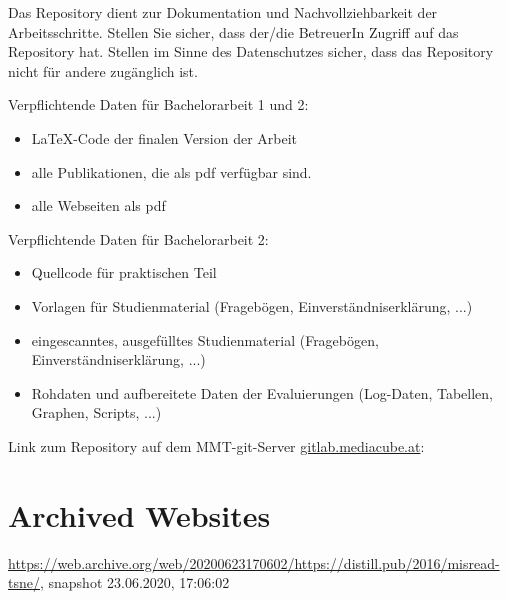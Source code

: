 \begin{appendices}
Das Repository dient zur Dokumentation und Nachvollziehbarkeit der Arbeitsschritte. Stellen Sie sicher, dass der/die BetreuerIn Zugriff auf das Repository hat. Stellen im Sinne des Datenschutzes sicher, dass das Repository nicht für andere zugänglich ist.

Verpflichtende Daten für Bachelorarbeit 1 und 2:

\begin{itemize}
	\item LaTeX-Code der finalen Version der Arbeit
	\item alle Publikationen, die als pdf verfügbar sind.
	\item alle Webseiten als pdf
\end{itemize}

Verpflichtende Daten für Bachelorarbeit 2:
\begin{itemize}
	\item Quellcode für praktischen Teil
	\item Vorlagen für Studienmaterial (Fragebögen, Einverständniserklärung, ...)	
	\item eingescanntes, ausgefülltes Studienmaterial (Fragebögen, Einverständniserklärung, ...)
	\item Rohdaten und aufbereitete Daten der Evaluierungen (Log-Daten, Tabellen, Graphen, Scripts, ...)	
\end{itemize}

Link zum Repository auf dem MMT-git-Server {\url{gitlab.mediacube.at}}:

	


\section{Archived Websites}
\sloppy
\url{https://web.archive.org/web/20200623170602/https://distill.pub/2016/misread-tsne/}, snapshot 23.06.2020, 17:06:02


\end{appendices}

